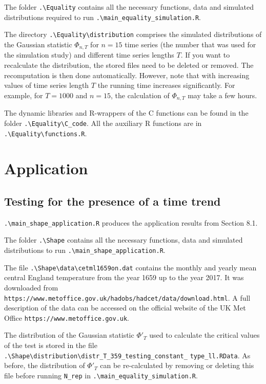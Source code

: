 \documentclass[a4paper,12pt]{article}
\begin{document}
The folder \verb|.\Equality| contains all the necessary functions, data and simulated distributions required to run \verb|.\main_equality_simulation.R|. 

The directory \verb|.\Equality\distribution| comprises the simulated distributions of the Gaussian statistic $\Phi_{n, T}$ for $n= 15$ time series (the number that was used for the simulation study) and different time series lengths $T$. If you want to recalculate the distribution, the stored files need to be deleted or removed. The recomputation is then done automatically. However, note that with increasing values of time series length $T$ the running time increases significantly. For example, for $T = 1000$ and $n = 15$, the calculation of $\Phi_{n, T}$ may take a few hours.  

The dynamic libraries and R-wrappers of the C functions can be found in the folder \verb|.\Equality\C_code|.
All the auxiliary R functions are in \verb|.\Equality\functions.R|.



\section*{Application}


\subsection*{Testing for the presence of a time trend}


\verb|.\main_shape_application.R| produces the application results from Section 8.1. 

The folder \verb|.\Shape| contains all the necessary functions, data and simulated distributions to run \verb|.\main_shape_application.R|. 

The file \verb|.\Shape\data\cetml1659on.dat| contains the monthly and yearly mean central England temperature from the year 1659 up to the year 2017. It was downloaded from 
\verb|https://www.metoffice.gov.uk/hadobs/hadcet/data/download.html|.
A full description of the data can be accessed on the official website of the UK Met Office \verb|https://www.metoffice.gov.uk|. 

The distribution of the Gaussian statistic $\Phi'_T$ used to calculate the critical values of the test is stored in the file
\verb|.\Shape\distribution\distr_T_359_testing_constant_| \verb|type_ll.RData|.
As before, the distribution of $\Phi'_T$ can be re-calculated by removing or deleting this file before running \verb|N_rep| in \verb|.\main_equality_simulation.R|.  
\end{document}
